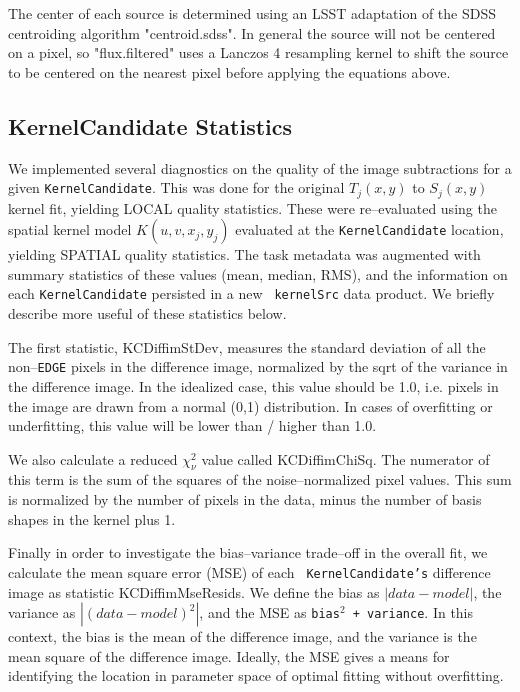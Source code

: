 \documentclass[prd, nofootinbib, floatfix, 11pt,tightenlines,times]{article}
\begin{document}
The center of each source is determined using an LSST adaptation of
the SDSS centroiding algorithm "centroid.sdss". In general the source
will not be centered on a pixel, so "flux.filtered" uses a Lanczos 4
resampling kernel to shift the source to be centered on the nearest
pixel before applying the equations above.

\subsection{KernelCandidate Statistics \label{sec-stats}}

We implemented several diagnostics on the quality of the image
subtractions for a given {\tt KernelCandidate}.  This was done for the
original $T_j(x,y)$ to $S_j(x,y)$ kernel fit, yielding LOCAL quality
statistics.  These were re--evaluated using the spatial kernel model
$K(u,v,x_j,y_j)$ evaluated at the {\tt KernelCandidate} location,
yielding SPATIAL quality statistics.  The task metadata was augmented
with summary statistics of these values (mean, median, RMS), and the
information on each {\tt KernelCandidate} persisted in a new {\tt
  kernelSrc} data product.  We briefly describe more useful of these
statistics below.

The first statistic, KCDiffimStDev, measures the standard deviation of
all the non--{\tt EDGE} pixels in the difference image, normalized by
the sqrt of the variance in the difference image.  In the idealized
case, this value should be 1.0, i.e. pixels in the image are drawn
from a normal (0,1) distribution.  In cases of overfitting or
underfitting, this value will be lower than / higher than 1.0.

We also calculate a reduced $\chi^2_\nu$ value called KCDiffimChiSq.
The numerator of this term is the sum of the squares of the
noise--normalized pixel values.  This sum is normalized by the number
of pixels in the data, minus the number of basis shapes in the kernel
plus 1.

Finally in order to investigate the bias--variance trade--off in the
overall fit, we calculate the mean square error (MSE) of each {\tt
  KernelCandidate's} difference image as statistic KCDiffimMseResids.
We define the bias as $\left| data - model \right|$, the variance as
$\left| (data - model)^2 \right|$, and the MSE as {\tt bias$^2$ +
  variance}.  In this context, the bias is the mean of the difference
image, and the variance is the mean square of the difference image.
Ideally, the MSE gives a means for identifying the location in
parameter space of optimal fitting without overfitting.
\end{document}
